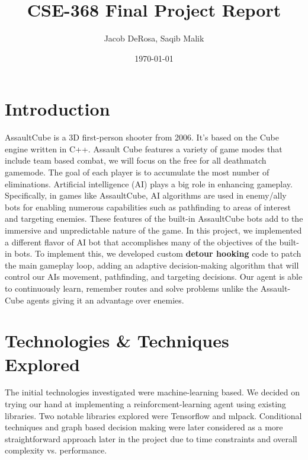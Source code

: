 \documentclass[11pt,a4paper]{article}
\title{CSE-368 Final Project Report}
\author{Jacob DeRosa, Saqib Malik}
\date{\today}
\begin{document}
\maketitle
\tableofcontents
\newpage

\section{Introduction}
AssaultCube is a 3D first-person shooter from 2006. It's based on the Cube engine written in C++. Assault Cube features a variety of game modes that include team based combat, we will focus on the free for all deathmatch gamemode. The goal of each player is to accumulate the most number of eliminations. Artificial intelligence (AI) plays a big role in enhancing gameplay. Specifically, in games like AssaultCube, AI algorithms are used in enemy/ally bots for enabling numerous capabilities such as pathfinding to areas of interest and targeting enemies. These features of the built-in AssaultCube bots add to the immersive and unpredictable nature of the game. In this project, we implemented a different flavor of AI bot that accomplishes many of the objectives of the built-in bots. To implement this, we developed custom \textbf{detour hooking} code to patch the main gameplay loop, adding an adaptive decision-making algorithm that will control our AIs movement, pathfinding, and targeting decisions. Our agent is able to continuously learn, remember routes and solve problems unlike the Assault-Cube agents giving it an advantage over enemies.

\section{Technologies \& Techniques Explored}
The initial technologies investigated were machine-learning based. We decided on trying our hand at implementing a reinforcment-learning agent using existing libraries. Two notable libraries explored were Tensorflow and mlpack. Conditional techniques and graph based decision making were later considered as a more straightforward approach later in the project due to time constraints and overall complexity vs. performance.
\end{document}
